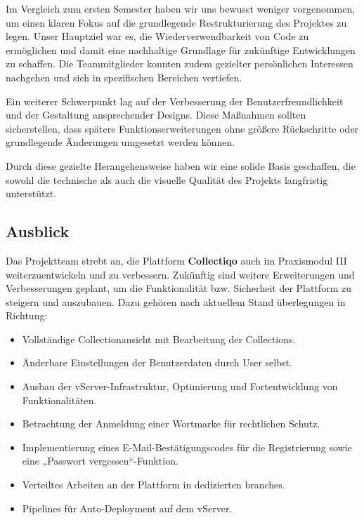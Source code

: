Im Vergleich zum ersten Semester haben wir uns bewusst weniger vorgenommen, um einen klaren Fokus auf die grundlegende Restrukturierung des Projektes zu legen.
Unser Hauptziel war es, die Wiederverwendbarkeit von Code zu ermöglichen und damit eine nachhaltige Grundlage für zukünftige Entwicklungen zu schaffen.
Die Teammitglieder konnten zudem gezielter persönlichen Interessen nachgehen und sich in spezifischen Bereichen vertiefen.

Ein weiterer Schwerpunkt lag auf der Verbesserung der Benutzerfreundlichkeit und der Gestaltung ansprechender Designs.
Diese Maßnahmen sollten sicherstellen, dass spätere Funktionserweiterungen ohne größere Rückschritte oder grundlegende Änderungen umgesetzt werden können.

Durch diese gezielte Herangehensweise haben wir eine solide Basis geschaffen, die sowohl die technische als auch die visuelle Qualität des Projekts langfristig unterstützt.

\subsection{Ausblick}\label{subsec:ausblick-zukuenftige-ziele-und-funktionen}

Das Projektteam strebt an, die Plattform \textbf{Collectiqo} auch im Praxismodul III weiterzuentwickeln und zu verbessern.
Zukünftig sind weitere Erweiterungen und Verbesserungen geplant, um die Funktionalität bzw. Sicherheit der Plattform zu steigern und auszubauen.
Dazu gehören nach aktuellem Stand überlegungen in Richtung:

\begin{itemize}[noitemsep]
    \item Vollständige Collectionansicht mit Bearbeitung der Collections.
    \item Änderbare Einstellungen der Benutzerdaten durch User selbst.
    \item Ausbau der vServer-Infrastruktur, Optimierung und Fortentwicklung von Funktionalitäten.
    \item Betrachtung der Anmeldung einer Wortmarke für rechtlichen Schutz.
    \item Implementierung eines E-Mail-Bestätigungscodes für die Registrierung sowie eine „Passwort vergessen“-Funktion.
    \item Verteiltes Arbeiten an der Plattform in dedizierten branches.
    \item Pipelines für Auto-Deployment auf dem vServer.
\end{itemize}


